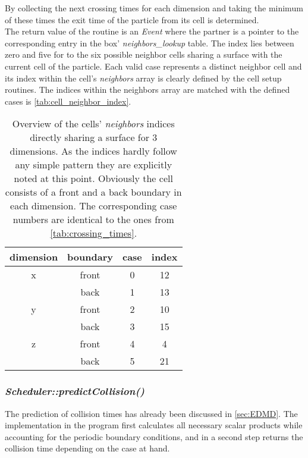 By collecting the next crossing times for each dimension and taking the minimum of these times the exit time of the particle from its cell is determined.\\

The return value of the routine is an \textit{Event} where the partner is a pointer to the corresponding entry in the box' \textit{neighbors\_lookup} table. The index lies between zero and five for to the six possible neighbor cells sharing a surface with the current cell of the particle. Each valid case represents a distinct neighbor cell and its index within the cell's \textit{neighbors} array is clearly defined by the cell setup routines. The indices within the neighbors array are matched with the defined cases is \autoref{tab:cell_neighbor_index}. 

\begin{table}[h]
\centering
\begin{tabular}{c|c|c|c}
dimension & boundary & case & index \\ \hline
x & front & 0 & 12 \\
 & back & 1 & 13 \\ \hline
y & front & 2 & 10 \\
 & back & 3 & 15 \\ \hline
z & front & 4 & 4 \\
 & back & 5 & 21 \\
\end{tabular}
\caption[Lookup table of cell neighbor indices]{Overview of the cells' \textit{neighbors} indices directly sharing a surface for 3 dimensions. As the indices hardly follow any simple pattern they are explicitly noted at this point. Obviously the cell consists of a front and a back boundary in each dimension. The corresponding case numbers are identical to the ones from \autoref{tab:crossing_times}.}
\label{tab:cell_neighbor_index}
\end{table}

\subsubsection{\quad \textit{Scheduler::predictCollision()}}
The prediction of collision times has already been discussed in \autoref{sec:EDMD}. The implementation in the program first calculates all necessary scalar products while accounting for the periodic boundary conditions, and in a second step returns the collision time depending on the case at hand.\\

